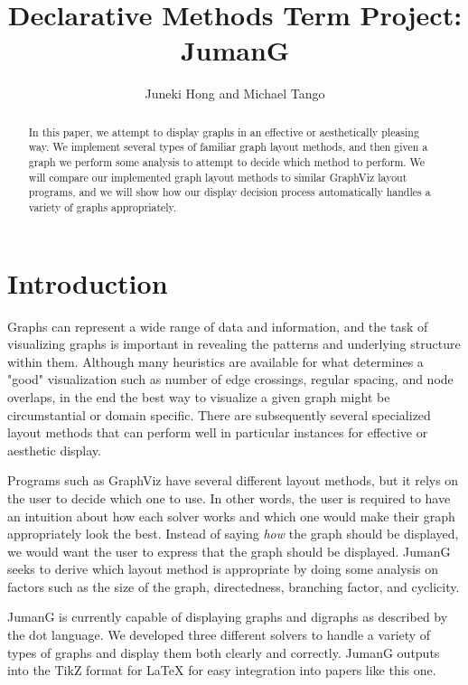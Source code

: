 \documentclass{article}
\title{Declarative Methods Term Project: \\ JumanG}
\author{Juneki Hong and Michael Tango}
\date{}
\begin{document}
\maketitle

\begin{abstract}
In this paper, we attempt to display graphs in an effective or aesthetically pleasing way. We implement several types of familiar graph layout methods, and then given a graph we perform some analysis to attempt to decide which method to perform. We will compare our implemented graph layout methods to similar GraphViz layout programs, and we will show how our display decision process automatically handles a variety of graphs appropriately.

\end{abstract}

\section{Introduction}
Graphs can represent a wide range of data and information, and the task of visualizing graphs is important in revealing the patterns and underlying structure within them. Although many heuristics are available for what determines a "good" visualization such as number of edge crossings, regular spacing, and node overlaps, in the end the best way to visualize a given graph might be circumstantial or domain specific. 
There are subsequently several specialized layout methods that can perform well in particular instances for effective or aesthetic display.
 
Programs such as GraphViz have several different layout methods, but it relys on the user to decide which one to use. 
In other words, the user is required to have an intuition about how each solver works and which one would make their graph appropriately look the best. Instead of saying \textit{how} the graph should be displayed, we would want the user to express that the graph should be displayed.
JumanG seeks to derive which layout method is appropriate by doing some analysis on factors such as the size of the graph, directedness, branching factor, and cyclicity.






JumanG is currently capable of displaying graphs and digraphs as described by the dot language. We developed three different solvers to handle 
a variety of types of graphs and display them both clearly and correctly. JumanG outputs into the TikZ format for LaTeX for easy integration into 
papers like this one.
\end{document}
